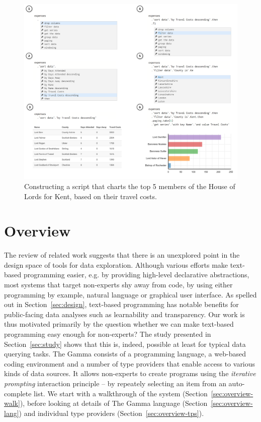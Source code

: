 \documentclass[manuscript,review,anonymous]{acmart}
\begin{document}
\begin{figure}[b]
\includegraphics[width=1\columnwidth]{figures/thegamma-walk}
\caption{Constructing a script that charts the top 5 members of the House of Lords for Kent, based
on their travel costs.}
\label{fig:walkthrough}
\end{figure}

\section{Overview}
\label{sec:overview}

The review of related work suggests that there is an unexplored point in the design space of tools
for data exploration. Although various efforts make text-based programming easier, e.g. by providing
high-level declarative abstractions, most systems that target non-experts shy away from code, by using
either programming by example, natural language or graphical user interface. As spelled out in
Section~\ref{sec:design}, text-based programming has notable benefits for public-facing data analyses
such as learnability and transparency. Our work is thus motivated primarily by the question whether we
can make text-based programming easy enough for non-experts? The study presented in Section~\ref{sec:study}
shows that this is, indeed, possible at least for typical data querying tasks.
The Gamma consists of a programming language, a web-based coding environment and a number of type providers
that enable access to various kinds of data sources. It allows non-experts to create programs using the
\emph{iterative prompting} interaction principle -- by repeately selecting an item from an auto-complete list.
We start with a walkthrough of the system (Section~\ref{sec:overview-walk}), before looking at details of
The Gamma language (Section~\ref{sec:overview-lang}) and individual type providers (Section~\ref{sec:overview-tps}).
\end{document}
